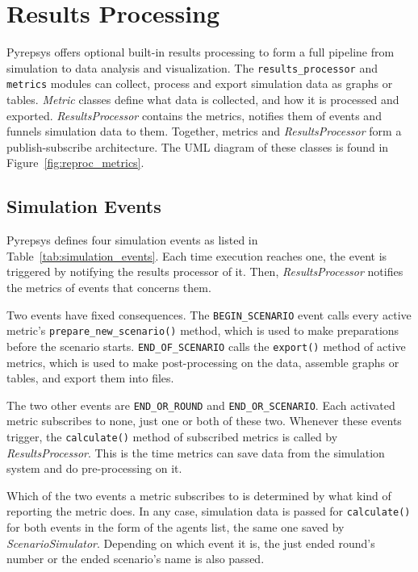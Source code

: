 \documentclass[%
    ]{\PathToTumTemplate/thesis/tum_thesis}
\begin{document}
\section{Results Processing}\label{sec:impl_results_processing}
Pyrepsys offers optional built-in results processing to form a full pipeline from simulation to data analysis and visualization.
The \lstinline{results_processor} and \lstinline{metrics} modules can collect, process and export simulation data as graphs or tables.
\emph{Metric} classes define what data is collected, and how it is processed and exported.
\emph{ResultsProcessor} contains the metrics, notifies them of events and funnels simulation data to them.
Together, metrics and \emph{ResultsProcessor} form a publish-subscribe architecture.
The UML diagram of these classes is found in Figure~\ref{fig:reproc_metrics}.


\subsection{Simulation Events}

Pyrepsys defines four simulation events as listed in Table~\ref{tab:simulation_events}.
Each time execution reaches one, the event is triggered by notifying the results processor of it.
Then, \emph{ResultsProcessor} notifies the metrics of events that concerns them.

Two events have fixed consequences.
The \lstinline{BEGIN_SCENARIO} event calls every active metric's \lstinline{prepare_new_scenario()} method, which is used to make preparations before the scenario starts.
\lstinline{END_OF_SCENARIO} calls the \lstinline{export()} method of active metrics, which is used to make post-processing on the data, assemble graphs or tables, and export them into files.

The two other events are \lstinline{END_OR_ROUND} and \lstinline{END_OR_SCENARIO}.
Each activated metric subscribes to none, just one or both of these two.
Whenever these events trigger, the \lstinline{calculate()} method of subscribed metrics is called by \emph{ResultsProcessor}.
This is the time metrics can save data from the simulation system and do pre-processing on it.

Which of the two events a metric subscribes to is determined by what kind of reporting the metric does.
In any case, simulation data is passed for \lstinline{calculate()} for both events in the form of the agents list, the same one saved by \emph{ScenarioSimulator}.
Depending on which event it is, the just ended round's number or the ended scenario's name is also passed.
\end{document}
